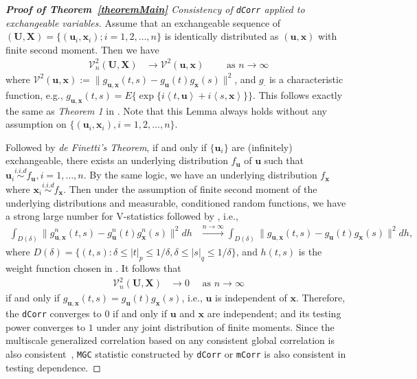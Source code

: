 \documentclass[11pt]{article}
\theoremstyle{definition}
\begin{document}
\begin{proof}[\textbf{Proof of Theorem~\ref{theoremMain}} Consistency of \texttt{dCorr} applied to exchangeable variables]

Assume that an exchangeable sequence of $(\mathbf{U}, \mathbf{X}) = \{ (\mathbf{u}_{i}, \mathbf{x}_{i}) ; i = 1,2, \ldots, n \}$ is identically distributed as $(\mathbf{u}, \mathbf{x})$ with finite second moment. Then we have 
\begin{eqnarray}
\mathcal{V}_{n}^{2}(\mathbf{U},\mathbf{X}) &\longrightarrow \mathcal{V}^{2}(\mathbf{u},\mathbf{x}) \quad \quad \mbox{ as } n \rightarrow \infty
\label{eq:conv1}
\end{eqnarray}
where $\mathcal{V}^{2} (\mathbf{u},\mathbf{x}) := \| g_{\mathbf{u},\mathbf{x}}(t,s) - g_{\mathbf{u}}(t) g_{\mathbf{x}}(s) \|^2$, and $g_{\cdot}$ is a characteristic function, e.g., $g_{\mathbf{u},\mathbf{x}}(t,s) = E\{\exp\{i \left\langle t,\mathbf{u} \right\rangle  +i \left\langle  s,\mathbf{x}\right\rangle \}\}$. This follows exactly the same as \textit{Theorem 1} in \cite{szekely2007measuring}. Note that this Lemma always holds without any assumption on $\{(\mathbf{u}_{i},\mathbf{x}_{i}), i=1,2,...,n\}$.

Followed by \textit{de Finetti's Theorem}, if and only if $\{ \mathbf{u}_{i} \}$ are (infinitely) exchangeable, there exists an underlying distribution $f_{\mathbf{u}}$ of $\mathbf{u}$ such that $\mathbf{u}_{i}  \overset{i.i.d}{\sim} f_{\mathbf{u}}, i = 1, \ldots, n$. By the same logic, we have an underlying distribution $f_{\mathbf{x}}$ where $\mathbf{x}_{i} \overset{i.i.d}{\sim} f_{\mathbf{x}}$. Then under the assumption of finite second moment of the underlying distributions and measurable, conditioned random functions, we have a strong large number for V-statistics followed by \cite{szekely2007measuring}, i.e., 
\begin{eqnarray}
\displaystyle\int_{D(\delta)}{\|g_{\mathbf{u},\mathbf{x}}^{n}(t,s)-g_{\mathbf{u}}^{n}(t)g_{\mathbf{x}}^{n}(s)\|^{2}}dh &\stackrel{n \rightarrow \infty}{\longrightarrow} 
\displaystyle\int_{D(\delta)}{\|g_{\mathbf{u},\mathbf{x}}(t,s)-g_{\mathbf{u}}(t)g_{\mathbf{x}}(s)\|^{2}}dh,
\label{eq:SLLN}
\end{eqnarray}
where $D(\delta)=\{(t,s):\delta \leq |t|_{p} \leq 1/\delta,\delta \leq |s|_{q} \leq 1/\delta\}$, and $h(t,s)$ is the weight function chosen in \cite{szekely2007measuring}. 	
It follows that 
\begin{eqnarray}
\mathcal{V}_{n}^{2}(\mathbf{U},\mathbf{X}) &\rightarrow 0 \quad \mbox{ as } n \rightarrow \infty
\label{eq:conv2}
\end{eqnarray}
if and only if $g_{\mathbf{u},\mathbf{x}}(t,s) = g_{\mathbf{u}}(t) g_{\mathbf{x}}(s)$, i.e., $\mathbf{u}$ is independent of $\mathbf{x}.$ Therefore, the \texttt{dCorr} converges to $0$ if and only if $\mathbf{u}$ and $\mathbf{x}$ are independent; and its testing power converges to $1$ under any joint distribution of finite moments. Since the multiscale generalized correlation based on any consistent global correlation is also consistent~\cite{shen2016discovering}, \texttt{MGC} statistic constructed by \texttt{dCorr} or \texttt{mCorr} is also consistent in testing dependence.
\end{proof}
\end{document}
